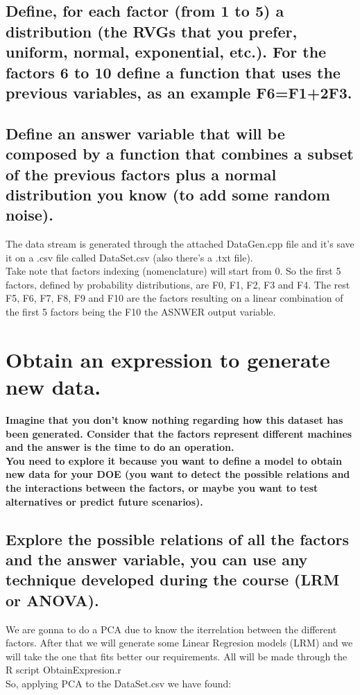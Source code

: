 \documentclass[12pt]{article}
\begin{document}
\subsection {Define, for each factor (from 1 to 5) a distribution (the RVGs that you prefer, uniform, normal, exponential, etc.). For the factors 6 to 10 define a function that uses the previous variables, as an example F6=F1+2F3.}
\subsection {Define an answer variable that will be composed by a function that combines a subset of the previous factors plus a normal distribution you know (to add some random noise).}
The data stream is generated through the attached DataGen.cpp file and it's save it on a .csv file called DataSet.csv (also there's a .txt file).\\
Take note that factors indexing (nomenclature) will start from 0. So the first 5 factors, defined by probability distributions, are F0, F1, F2, F3 and F4. The rest F5, F6, F7, F8, F9 and F10 are the factors resulting on a linear combination of the first 5 factors being the F10 the ASNWER output variable.

\section {Obtain an expression to generate new data.}
\vspace{5mm}
\textbf{Imagine that you don’t know nothing regarding how this dataset has been generated. Consider that the factors represent different machines and the answer is the time to do an operation.\\
You need to explore it because you want to define a model to obtain new data for your DOE (you want to detect the possible relations and the interactions between the factors, or maybe you want to test alternatives or predict future scenarios).}
\subsection {Explore the possible relations of all the factors and the answer variable, you can use any technique developed during the course (LRM or ANOVA).}

We are gonna to do a PCA due to know the iterrelation between the different factors. After that we will generate some Linear Regresion models (LRM) and we will take the one that fits better our requirements. All will be made through the R script ObtainExpresion.r\\
So, applying PCA to the DataSet.csv we have found:\\
\end{document}
